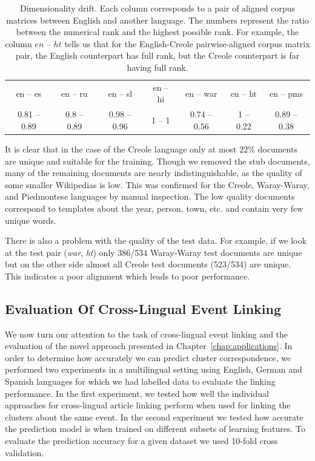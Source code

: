 \begin{table}[t]
\caption[Dimensionality drift]{Dimensionality drift. Each column corresponds to a pair of aligned corpus matrices between
English and another language. The numbers represent the ratio between the numerical rank and the highest
possible rank. For example, the column $en$ -- $ht$ tells us that for the English-Creole pairwise-aligned
corpus matrix pair, the English counterpart has full rank, but the Creole counterpart is far having full rank.}
\begin{center}
\begin{tabular}{|c|c|c|c|c|c|c|}
\cline{1-7}
en -- es     &   en -- ru     &   en -- sl       &     en -- hi &   en -- war      &      en -- ht &   en -- pms\\
\cline{1-7}
0.81 -- 0.89   &  0.8 -- 0.89  &   0.98 -- 0.96    &    1 -- 1  &  0.74 -- 0.56  &      1 -- 0.22  &   0.89 -- 0.38\\
\cline{1-7}
\end{tabular}
\end{center}
\label{table:rank}
\end{table}

It is clear that in the case of the Creole language only at most $22\%$ documents are unique and suitable
for the training. Though we removed the stub documents, many of the remaining documents are nearly indistinguishable,
as the quality of some smaller Wikipedias is low. This was confirmed for the Creole, Waray-Waray,
and Piedmontese languages by manual inspection. The low quality documents correspond to templates
about the year, person, town, etc. and contain very few unique words.

There is also a problem with the quality of the test data. For example, if we look at the
test pair (\emph{war}, \emph{ht}) only 386/534 Waray-Waray test documents are unique but
on the other side almost all Creole test documents (523/534) are unique. This indicates a poor
alignment which leads to poor performance.


\subsection{Evaluation Of Cross-Lingual Event Linking}
We now turn our attention to the task of cross-lingual event linking and the
evaluation of the novel approach presented in Chapter~\ref{chap:applications}.
In order to determine how accurately we can predict cluster correspondence, we performed two
experiments in a multilingual setting using English, German and Spanish languages for which
we had labelled data to evaluate the linking performance. In the first experiment,
we tested how well the individual approaches for cross-lingual article linking
perform when used for linking the clusters about the same event. In the second
experiment we tested how accurate the prediction model is when trained on different
subsets of learning features. To evaluate the prediction accuracy for a given dataset
we used 10-fold cross validation.

